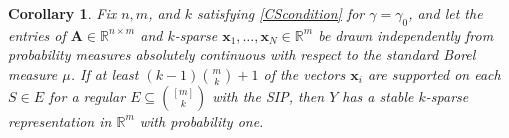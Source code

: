 \documentclass[9pt,twocolumn]{pnas-new}
\newtheorem{theorem}{Theorem}
\newtheorem{corollary}{Corollary}
\begin{document}

\begin{corollary}\label{ProbabilisticCor}
Fix $n, m$, and $k$ satisfying \eqref{CScondition} for $\gamma = \gamma_0$, and let the entries of $\mathbf{A} \in \mathbb{R}^{n \times m}$ and $k$-sparse $\mathbf{x}_1, \ldots, \mathbf{x}_N \in \mathbb{R}^m$ be drawn independently from probability measures absolutely continuous with respect to the standard Borel measure $\mu$. If at least $(k-1){m \choose k} + 1$ of the vectors $\mathbf{x}_i$ are supported on each $S \in E$ for a regular $E \subseteq {[m] \choose k}$ with the SIP, then $Y$ has a stable $k$-sparse representation in $\mathbb{R}^m$ with probability one.
\end{corollary}




%
\end{document}
